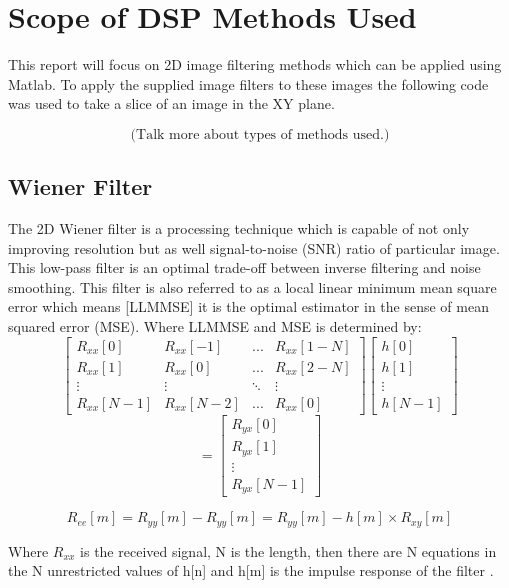 \documentclass[%
reprint,
showpacs,preprintnumbers,
bibnotes,
amsmath,amssymb,
aps,
pra,
]{revtex4-1}
\begin{document}
	\section{\label{sec:level1} Scope of DSP Methods Used}
	This report will focus on 2D image filtering methods which can be applied using Matlab. To apply the supplied image filters to these images the following code was used to take a slice of an image in the XY plane.

	$$\text{(Talk more about types of methods used.)}$$
	\subsection{\label{sec:level2} Wiener Filter}
	The 2D Wiener filter is a processing technique which is capable of not only improving resolution but as well signal-to-noise (SNR) ratio of particular image. This low-pass filter is an optimal trade-off between inverse filtering and noise smoothing. This filter is also referred to as a local linear minimum mean square error which means [LLMMSE] it is the optimal estimator in the sense of mean squared error (MSE). Where LLMMSE and MSE is determined by:
$$
\begin{bmatrix}
R_{xx}[0] & R_{xx}[-1] & ... & R_{xx}[1-N]\\
R_{xx}[1] & R_{xx}[0] & ... & R_{xx}[2-N]\\
\vdots & \vdots & \ddots & \vdots \\
R_{xx}[N-1] & R_{xx}[N-2] & ... & R_{xx}[0]
\end{bmatrix}
\begin{bmatrix}
h[0]\\
h[1]\\
\vdots\\
h[N-1]
\end{bmatrix}
$$
$$
=
\begin{bmatrix}
R_{yx}[0]\\
R_{yx}[1]\\
\vdots\\
R_{yx}[N-1]
\end{bmatrix}
$$

$$R_{ee}[m]=R_{yy}[m]-R_{yy}[m] = R_{yy}[m]-h[m] \times R_{xy}[m]$$

Where $R_{xx}$ is the received signal, N is the length, then there are N equations in the N unrestricted values of h[n] and h[m] is the impulse response of the filter \cite{Oppenheim_2015}.
\end{document}
